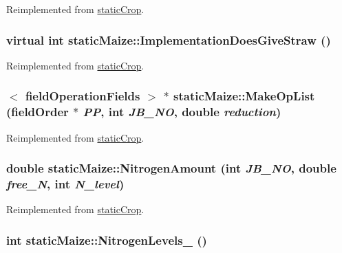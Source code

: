 Reimplemented from \hyperlink{classstatic_crop_afe0cb8a7831afa941a37338f05227d67}{staticCrop}.\hypertarget{classstatic_maize_a4b48acc64147a6c46ee154570c65b2fe}{
\subsubsection[{ImplementationDoesGiveStraw}]{\setlength{\rightskip}{0pt plus 5cm}virtual int staticMaize::ImplementationDoesGiveStraw ()}}
\label{classstatic_maize_a4b48acc64147a6c46ee154570c65b2fe}


Reimplemented from \hyperlink{classstatic_crop_a9e8458d1bb0bab4c9a7d05f47fe24537}{staticCrop}.\hypertarget{classstatic_maize_a57e27a95b36604807c2eed91446df668}{
\subsubsection[{MakeOpList}]{$<$ {\bf fieldOperationFields} $>$ $\ast$ staticMaize::MakeOpList ({\bf fieldOrder} $\ast$ {\em PP}, \/  int {\em JB\_\-NO}, \/  double {\em reduction})}}
\label{classstatic_maize_a57e27a95b36604807c2eed91446df668}


Reimplemented from \hyperlink{classstatic_crop_a9b67ef1ae531a3afb32b63a4aeb5916b}{staticCrop}.\hypertarget{classstatic_maize_adafefb969922559e085bbe97b7406eb9}{
\subsubsection[{NitrogenAmount}]{\setlength{\rightskip}{0pt plus 5cm}double staticMaize::NitrogenAmount (int {\em JB\_\-NO}, \/  double {\em free\_\-N}, \/  int {\em N\_\-level})}}
\label{classstatic_maize_adafefb969922559e085bbe97b7406eb9}


Reimplemented from \hyperlink{classstatic_crop_af3aa85321a8a75406f8a0751b71587d0}{staticCrop}.\hypertarget{classstatic_maize_aa09f67751bfbfe9a3e7e414cffaab133}{
\subsubsection[{NitrogenLevels\_\-}]{\setlength{\rightskip}{0pt plus 5cm}int staticMaize::NitrogenLevels\_\- ()}}
\label{classstatic_maize_aa09f67751bfbfe9a3e7e414cffaab133}



